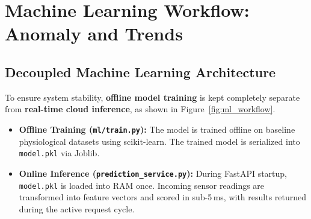 \documentclass[12pt]{article}
\begin{document}
\section{Machine Learning Workflow: Anomaly and Trends}
\label{sec:ml_workflow}

\subsection{Decoupled Machine Learning Architecture}
To ensure system stability, \textbf{offline model training} is kept completely separate from \textbf{real-time cloud inference}, as shown in Figure~\ref{fig:ml_workflow}.
\begin{itemize}
    \item \textbf{Offline Training (\texttt{ml/train.py}):} The model is trained offline on baseline physiological datasets using scikit-learn. The trained model is serialized into \texttt{model.pkl} via Joblib.
    \item \textbf{Online Inference (\texttt{prediction\_service.py}):} During FastAPI startup, \texttt{model.pkl} is loaded into RAM once. Incoming sensor readings are transformed into feature vectors and scored in sub-5\,ms, with results returned during the active request cycle.
\end{itemize}
\end{document}
